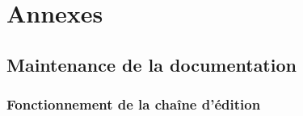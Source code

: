 \documentclass[letterpaper,10pt,french]{sphinxmanual}
\begin{document}
\chapter{Annexes}
\label{\detokenize{annexes:annexes}}\label{\detokenize{annexes::doc}}

\section{Maintenance de la documentation}
\label{\detokenize{readthedocs/maintenance:maintenance-de-la-documentation}}\label{\detokenize{readthedocs/maintenance::doc}}

\subsection{Fonctionnement de la chaîne d’édition}
\label{\detokenize{readthedocs/maintenance:fonctionnement-de-la-chaine-d-edition}}\begin{quote}

\begin{figure}[htbp]
\centering
{}\end{figure}
\end{quote}
\end{document}
